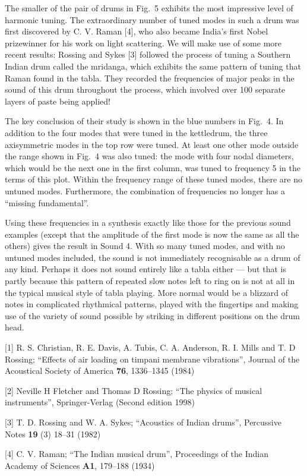   The smaller of the pair of drums in Fig.\ 5 exhibits the most impressive 
  level of harmonic tuning. The extraordinary number of tuned modes in such a 
  drum was first discovered by C. V. Raman [4], who also became India's first 
  Nobel prizewinner for his work on light scattering. We will make use of some 
  more recent results: Rossing and Sykes [3] followed the process of tuning a 
  Southern Indian drum called the mridanga, which exhibits the same pattern of 
  tuning that Raman found in the tabla. They recorded the frequencies of major 
  peaks in the sound of this drum throughout the process, which involved over 
  100 separate layers of paste being applied! 

  The key conclusion of their study is shown in the blue numbers in Fig.\ 4. In 
  addition to the four modes that were tuned in the kettledrum, the three 
  axisymmetric modes in the top row were tuned. At least one other mode outside 
  the range shown in Fig.\ 4 was also tuned: the mode with four nodal 
  diameters, which would be the next one in the first column, was tuned to 
  frequency 5 in the terms of this plot. Within the frequency range of these 
  tuned modes, there are no untuned modes. Furthermore, the combination of 
  frequencies no longer has a ``missing fundamental''. 

  Using these frequencies in a synthesis exactly like those for the previous 
  sound examples (except that the amplitude of the first mode is now the same 
  as all the others) gives the result in Sound 4. With so many tuned modes, and 
  with no untuned modes included, the sound is not immediately recognisable as 
  a drum of any kind. Perhaps it does not sound entirely like a tabla either 
  --- but that is partly because this pattern of repeated slow notes left to 
  ring on is not at all in the typical musical style of tabla playing. More 
  normal would be a blizzard of notes in complicated rhythmical patterns, 
  played with the fingertips and making use of the variety of sound possible by 
  striking in different positions on the drum head. 



  \sectionreferences{}[1] R. S. Christian, R. E. Davis, A. Tubis, C. A. 
  Anderson, R. I. Mills and T. D Rossing; ``Effects of air loading on timpani 
  membrane vibrations'', Journal of the Acoustical Society of America 
  \textbf{76}, 1336--1345 (1984) 

  [2] Neville H Fletcher and Thomas D Rossing; ``The physics of musical 
  instruments'', Springer-Verlag (Second edition 1998) 

  [3] T. D. Rossing and W. A. Sykes; ``Acoustics of Indian drums'', Percussive 
  Notes \textbf{19} (3) 18--31 (1982) 

  [4] C. V. Raman; ``The Indian musical drum'', Proceedings of the Indian 
  Academy of Sciences \textbf{A1}, 179--188 (1934) 